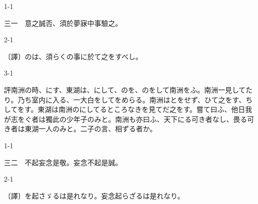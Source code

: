 \documentclass[tate,paper=b6j,jafontsize=9pt]{jlreq}
\begin{document}
\begin{azconvIndented}{1\zw}{-1\zw}

三一　意之誠否、須於夢寐中事驗\azconvKunten{\azconvJR}之。

\end{azconvIndented}
\begin{azconvIndented}{2\zw}{-1\zw}

〔譯〕のは、須らくの事に於て之をすべし。

\end{azconvIndented}
\begin{azconvIndented}{3\zw}{-1\zw}

評南洲の時、にす、東湖は、にして、のを、のをして南洲をふ。南洲一見してたり。乃ち室内に入る、一大白をしてをめらる。南洲はとをせず、ひて之をす、ちしてをす。東湖は南洲のにしてるところなきを見てだ之をす。嘗て曰ふ、他日我が志をぐ者は獨此の少年子のみと。南洲も亦曰ふ、天下にる可き者なし、畏る可き者は東湖一人のみと。二子の言、相ずる者か。

\end{azconvIndented}

\begin{azconvIndented}{1\zw}{-1\zw}

三二　不起妄念是敬。妄念不起是誠。

\end{azconvIndented}
\begin{azconvIndented}{2\zw}{-1\zw}

〔譯〕を起さゞるは是れなり。妄念起らざるは是れなり。

\end{azconvIndented}
\end{document}
